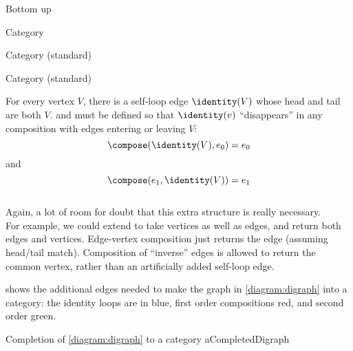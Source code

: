 \begin{plSection}{Bottom up}
\begin{plSection}{Category}
\begin{plSection}{Category (standard)}
\begin{plDefinition}{Category (standard)}{}
\begin{description}
For every vertex $V$, there is a self-loop edge 
$\identity(V)$ whose head and tail
are both $V$.
\compose and \identity
must be defined so that  $\identity(v)$ 
``disappears'' in any composition with edges 
entering or leaving $V$:
\[ 
\compose(\identity(V),e_0) = e_0 \]
and
\[ \compose(e_1,\identity(V)) = e_1 \]
\\
Again, a lot of room for doubt that this extra structure 
is really necessary.
\\
For example, we could extend \compose 
to take vertices as well as edges,
and return both edges and vertices.
Edge-vertex composition just returns the edge (assuming head/tail match).
Composition of ``inverse'' edges is allowed to return the common vertex,
rather than an artificially added self-loop edge.
\end{description}
\end{plDefinition}

 shows the additional
edges needed to make the graph in \cref{diagram:digraph}
into a category: the identity loops are in blue, first order
compositions red, and second order green.

\begin{plDiagram}
{Completion of \cref{diagram:digraph} to a category}
{aCompletedDigraph}
\centering
\end{plDiagram}


\end{plSection}
\end{plSection}
\end{plSection}
